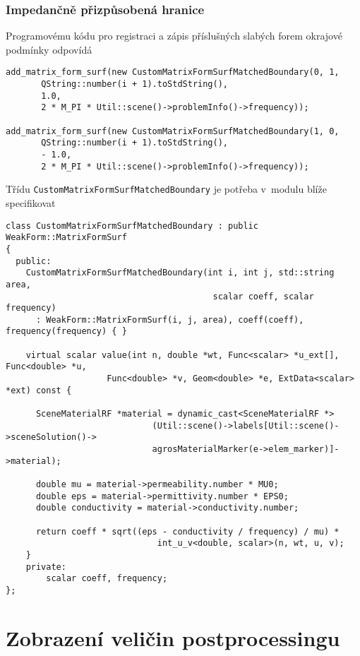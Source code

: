 \subsubsection*{Impedančně přizpůsobená hranice}
Programovému kódu pro registraci a zápis příslušných slabých forem okrajové podmínky odpovídá
\begin{verbatim}
add_matrix_form_surf(new CustomMatrixFormSurfMatchedBoundary(0, 1,
       QString::number(i + 1).toStdString(),
       1.0,
       2 * M_PI * Util::scene()->problemInfo()->frequency));
       
add_matrix_form_surf(new CustomMatrixFormSurfMatchedBoundary(1, 0,
       QString::number(i + 1).toStdString(),
       - 1.0,
       2 * M_PI * Util::scene()->problemInfo()->frequency));            
\end{verbatim}
Třídu \texttt{CustomMatrixFormSurfMatchedBoundary} je potřeba v~modulu blíže specifikovat
\begin{verbatim}
class CustomMatrixFormSurfMatchedBoundary : public WeakForm::MatrixFormSurf
{
  public:
    CustomMatrixFormSurfMatchedBoundary(int i, int j, std::string area, 
                                         scalar coeff, scalar frequency)
      : WeakForm::MatrixFormSurf(i, j, area), coeff(coeff), frequency(frequency) { }

    virtual scalar value(int n, double *wt, Func<scalar> *u_ext[], Func<double> *u, 
                    Func<double> *v, Geom<double> *e, ExtData<scalar> *ext) const {
      
      SceneMaterialRF *material = dynamic_cast<SceneMaterialRF *>
                             (Util::scene()->labels[Util::scene()->sceneSolution()->
                             agrosMaterialMarker(e->elem_marker)]->material);

      double mu = material->permeability.number * MU0;
      double eps = material->permittivity.number * EPS0;
      double conductivity = material->conductivity.number;

      return coeff * sqrt((eps - conductivity / frequency) / mu) * 
                              int_u_v<double, scalar>(n, wt, u, v);
    }
    private:
        scalar coeff, frequency;
};
\end{verbatim}

\section{Zobrazení veličin postprocessingu}
